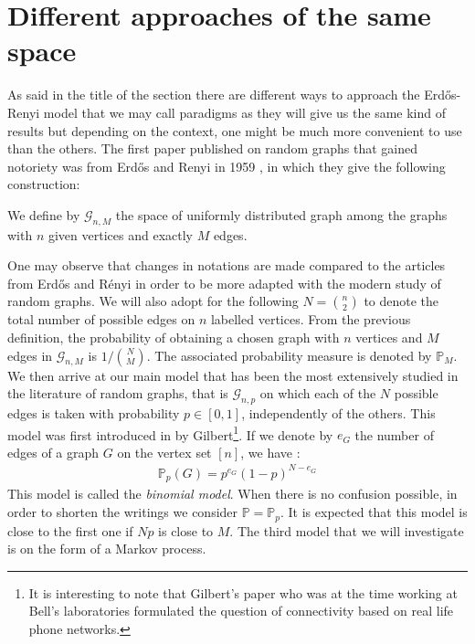 \section{Different approaches of the same space}
As said in the title of the section there are different ways to approach the Erd\H{o}s-Renyi model that we may call paradigms as they will give us the same kind of results but depending on the context, one might be much more convenient to use than the others.
\newline
The first paper published on random graphs that gained notoriety was from Erd\H{o}s and Renyi in 1959 \cite{erdos59}, in which they give the following construction:
\begin{definition}
We define by $\mathcal{G}_{n, M}$ the space of uniformly distributed graph among the graphs with $n$ given vertices and exactly $M$ edges.
\end{definition}
One may observe that changes in notations are made compared to the articles from Erd\H{o}s and R\'enyi in order to be more adapted with the modern study of random graphs.
We will also adopt for the following $N = \binom{n}{2}$ to denote the total number of possible edges on $n$ labelled vertices.
From the previous definition, the probability of obtaining a chosen graph with $n$ vertices and $M$ edges in $\mathcal{G}_{n, M}$ is $1/\binom{N}{M}$.
The associated probability measure is denoted by $\mathbb{P}_M$.
\newline
We then arrive at our main model that has been the most extensively studied in the literature of random graphs, that is $\mathcal{G}_{n, p}$ on which each of the $N$ possible edges is taken with probability $p \in [0, 1]$, independently of the others.
This model was first introduced in \cite{Gilbert59} by Gilbert\footnote{It is interesting to note that Gilbert's paper who was at the time working at Bell's laboratories formulated the question of connectivity based on real life phone networks.}.
\newline
If we denote by $e_G$ the number of edges of a graph $G$ on the vertex set $[n]$, we have :
\begin{align}
	\mathbb{P}_p(G) = p^{e_G}(1-p)^{N-e_G}
\end{align}
This model is called the \emph{binomial model}.
When there is no confusion possible, in order to shorten the writings we consider $\mathbb{P}=\mathbb{P}_p$.
It is expected that this model is close to the first one if $Np$ is close to $M$.
\newline
The third model that we will investigate is on the form of a Markov process. 
